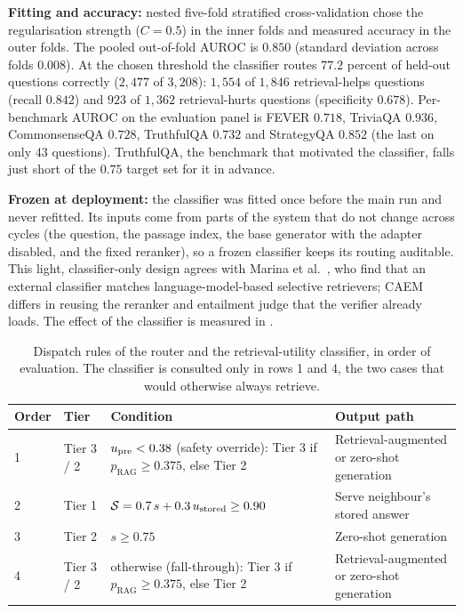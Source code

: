 \textbf{Fitting and accuracy:} nested five-fold stratified cross-validation chose the regularisation strength ($C = 0.5$) in the inner folds and measured accuracy in the outer folds. The pooled out-of-fold AUROC is $0.850$ (standard deviation across folds $0.008$). At the chosen threshold the classifier routes $77.2$ percent of held-out questions correctly ($2{,}477$ of $3{,}208$): $1{,}554$ of $1{,}846$ retrieval-helps questions (recall $0.842$) and $923$ of $1{,}362$ retrieval-hurts questions (specificity $0.678$). Per-benchmark AUROC on the evaluation panel is FEVER $0.718$, TriviaQA $0.936$, CommonsenseQA $0.728$, TruthfulQA $0.732$ and StrategyQA $0.852$ (the last on only $43$ questions). TruthfulQA, the benchmark that motivated the classifier, falls just short of the $0.75$ target set for it in advance.

\textbf{Frozen at deployment:} the classifier was fitted once before the main run and never refitted. Its inputs come from parts of the system that do not change across cycles (the question, the passage index, the base generator with the adapter disabled, and the fixed reranker), so a frozen classifier keeps its routing auditable. This light, classifier-only design agrees with Marina et al.~\cite{moskvoretskii2025llm}, who find that an external classifier matches language-model-based selective retrievers; CAEM differs in reusing the reranker and entailment judge that the verifier already loads. The effect of the classifier is measured in .

\begin{table}[!htbp]
\centering
\small
\begin{tabular}{@{}p{1.2cm}p{1.3cm}>{\raggedright\arraybackslash}p{5.7cm}>{\raggedright\arraybackslash}p{4.2cm}@{}}
\toprule
\textbf{Order} & \textbf{Tier} & \textbf{Condition} & \textbf{Output path} \\
\midrule
1 & Tier 3 / 2 & $u_{\text{pre}} < 0.38$ (safety override): Tier 3 if $p_{\text{RAG}} \ge 0.375$, else Tier 2 & Retrieval-augmented or zero-shot generation \\
2 & Tier 1 & $\mathcal{S} = 0.7\,s + 0.3\,u_{\text{stored}} \ge 0.90$ & Serve neighbour's stored answer \\
3 & Tier 2 & $s \ge 0.75$ & Zero-shot generation \\
4 & Tier 3 / 2 & otherwise (fall-through): Tier 3 if $p_{\text{RAG}} \ge 0.375$, else Tier 2 & Retrieval-augmented or zero-shot generation \\
\bottomrule
\end{tabular}
\caption[Dispatch rules of the router and the retrieval-utility classifier.]{Dispatch rules of the router and the retrieval-utility classifier, in order of evaluation. The classifier is consulted only in rows 1 and 4, the two cases that would otherwise always retrieve.}
\label{tab:dispatch-rules}
\label{tab:ruc-dispatch}
\end{table}

